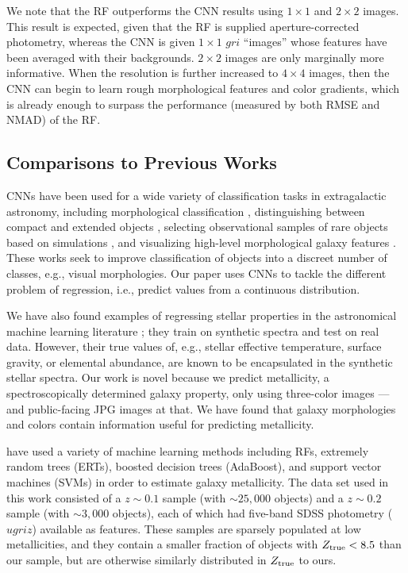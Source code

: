 \documentclass[fleqn,usenatbib]{mnras}
\begin{document}
We note that the RF outperforms the CNN results using $1\times 1$ and $2 \times 2$ images.
This result is expected, given that the RF is supplied aperture-corrected photometry, whereas the CNN is given $1 \times 1 $ $gri$ ``images'' whose features have been averaged with their backgrounds.
$2 \times 2$ images are only marginally more informative.
When the resolution is further increased to $4 \times 4$ images, then the CNN can begin to learn rough morphological features and color gradients, which is already enough to surpass the performance (measured by both RMSE and NMAD) of the RF.

\subsection{Comparisons to Previous Works}\label{sec:previous work}

CNNs have been used for a wide variety of classification tasks in extragalactic astronomy, including morphological classification \citep[see, e.g.,][]{2015MNRAS.450.1441D,2015ApJS..221....8H,2017MNRAS.464.4420S}, distinguishing between compact and extended objects \citep{2017MNRAS.464.4463K}, selecting observational samples of rare objects based on simulations \citep{2018ApJ...858..114H,2018MNRAS.473.3895L}, and visualizing high-level morphological galaxy features \citep{2018arXiv180705657D}.
These works seek to improve classification of objects into a discreet number of classes, e.g., visual morphologies.
Our paper uses CNNs to tackle the different problem of regression, i.e., predict values from a continuous distribution.

We have also found examples of regressing stellar properties in the astronomical machine learning literature \citep[see, e.g.,][]{2000A&A...357..197B,2018MNRAS.475.2978F}; they train on synthetic spectra and test on real data.
However, their true values of, e.g., stellar effective temperature, surface gravity, or elemental abundance, are known to be encapsulated in the synthetic stellar spectra.
Our work is novel because we predict metallicity, a spectroscopically determined galaxy property, only using three-color images --- and public-facing JPG images at that.
We have found that galaxy morphologies and colors contain information useful for predicting metallicity.


\cite{2016MNRAS.456.1618A} have used a variety of machine learning methods including RFs, extremely random trees (ERTs), boosted decision trees (AdaBoost), and support vector machines (SVMs) in order to estimate galaxy metallicity.
The data set used in this work consisted of a $z \sim 0.1$ sample (with $\sim 25,000$ objects) and a $z \sim 0.2$ sample (with $\sim 3,000$ objects), each of which had five-band SDSS photometry ($ugriz$) available as features.
These samples are sparsely populated at low metallicities, and they contain a smaller fraction of objects with $Z_{\rm true} < 8.5$ than our sample, but are otherwise similarly distributed in $Z_{\rm true}$ to ours.
\end{document}
